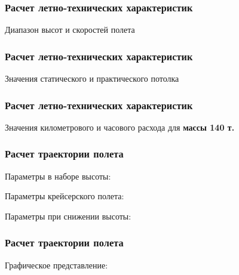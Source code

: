 \documentclass{beamer}
\begin{document}
\begin{frame}
    \frametitle{Расчет летно-технических характеристик}
    \begin{center}
   Диапазон высот и скоростей полета 
\resizebox{0.70\textwidth}{!}{
{}
}
\end{center}
\end{frame}

\begin{frame}[t]
    \frametitle{Расчет летно-технических характеристик}
    \begin{center}
        Значения статического и практического потолка
        \resizebox{.70\linewidth}{!}{}
    \end{center}
\end{frame}
\begin{frame}[t]
    \frametitle{Расчет летно-технических характеристик}
    \begin{center}
        Значения километрового и часового расхода для \textbf{массы 140 т.}
        \resizebox{.70\linewidth}{!}{}
    \end{center}
\end{frame}
\begin{frame}[t]
    \frametitle{Расчет траектории полета}

    \begin{center}
        Параметры в наборе высоты:

        
        \vfill

        Параметры крейсерского полета:

        
        \vfill
        Параметры  при снижении высоты:

        
    \end{center}
\end{frame}

\begin{frame}[t]
    \frametitle{Расчет траектории полета}
    \begin{center}
        Графическое представление:
        \resizebox{.70\linewidth}{!}{}
    \end{center}
\end{frame}
\end{document}
